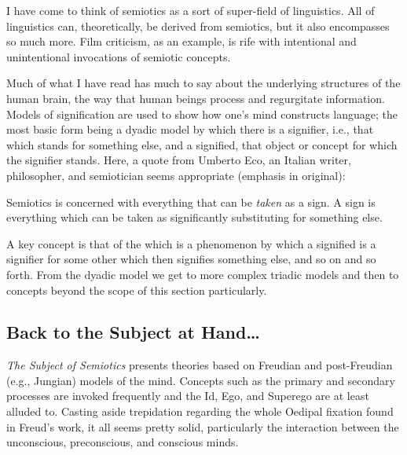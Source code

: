 \documentclass[../butidigress.tex]{subfiles}
\begin{document}
I have come to think of semiotics as a sort of super-field of linguistics.
All of linguistics can, theoretically, be derived from semiotics, but it also encompasses so much more.
Film criticism, as an example, is rife with intentional and unintentional invocations of semiotic concepts.

Much of what I have read has much to say about the underlying structures of the human brain, the way that human beings process and regurgitate information.
Models of signification are used to show how one's mind constructs language; the most basic form being a dyadic model by which there is a signifier, i.e., that which stands for something else, and a signified, that object or concept for which the signifier stands.
Here, a quote from Umberto Eco, an Italian writer, philosopher, and semiotician seems appropriate (emphasis in original):
\begin{displayquote}
Semiotics is concerned with everything that can be \emph{taken} as a sign.
A sign is everything which can be taken as significantly substituting for something else.\autocite{ecosemiotics}
\end{displayquote}

A key concept is that of the  which is a phenomenon by which a signified is a signifier for some other  which then signifies something else, and so on and so forth.
From the dyadic model we get to more complex triadic models and then to concepts beyond the scope of this section particularly.

\subsection{Back to the Subject at Hand\ldots}

\textit{The Subject of Semiotics} presents theories based on Freudian and post-Freudian (e.g., Jungian) models of the mind.
Concepts such as the primary and secondary processes are invoked frequently and the Id, Ego, and Superego are at least alluded to.
Casting aside trepidation regarding the whole Oedipal fixation found in Freud's work, it all seems pretty solid, particularly the interaction between the unconscious, preconscious, and conscious minds.
\end{document}
